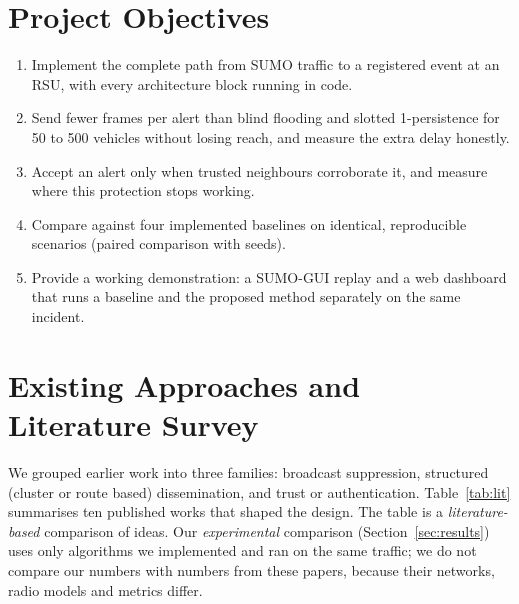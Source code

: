 \documentclass[11pt, a4paper]{article}
\begin{document}
\section{Project Objectives}
\begin{enumerate}[label=\textbf{O\arabic*.}, noitemsep, topsep=2pt]
  \item Implement the complete path from SUMO traffic to a registered event at an RSU, with every architecture block
        running in code.
  \item Send fewer frames per alert than blind flooding and slotted 1-persistence for 50 to 500 vehicles without losing
        reach, and measure the extra delay honestly.
  \item Accept an alert only when trusted neighbours corroborate it, and measure where this protection stops working.
  \item Compare against four implemented baselines on identical, reproducible scenarios (paired comparison with seeds).
  \item Provide a working demonstration: a SUMO-GUI replay and a web dashboard that runs a baseline and the proposed
        method separately on the same incident.
\end{enumerate}

\section{Existing Approaches and Literature Survey}
\label{sec:lit}
We grouped earlier work into three families: broadcast suppression, structured (cluster or route based) dissemination,
and trust or authentication. Table~\ref{tab:lit} summarises ten published works that shaped the design. The table is a
\emph{literature-based} comparison of ideas. Our \emph{experimental} comparison (Section~\ref{sec:results}) uses only
algorithms we implemented and ran on the same traffic; we do not compare our numbers with numbers from these papers,
because their networks, radio models and metrics differ.
\end{document}
